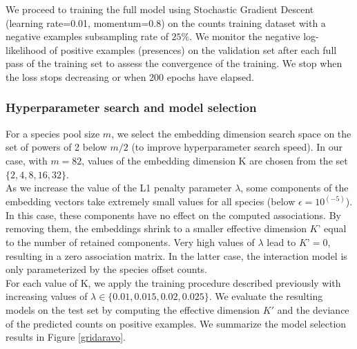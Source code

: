 \documentclass[]{article}
\begin{document}
\noindent We proceed to training the full model using Stochastic Gradient Descent (learning rate=0.01, momentum=0.8) on the counts training dataset with a negative examples subsampling rate of $25\%$. We monitor the negative log-likelihood of positive examples (presences) on the validation set after each full pass of the training set to assess the convergence of the training. We stop when the loss stops decreasing or when 200 epochs have elapsed.

\subsubsection{Hyperparameter search and model selection}
For a species pool size $m$, we select the embedding dimension search space on the set of powers of 2 below $m/2$ (to improve hyperparameter search speed). In our case, with $m=82$, values of the embedding dimension K are chosen from the set $\{2,4,8,16,32\}$. \\

\noindent As we increase the value of the L1 penalty parameter $\lambda$, some components of the embedding vectors take extremely small values for all species (below $\epsilon=10^(-5)$). In this case, these components have no effect on the computed associations. By removing them, the embeddings shrink to a smaller effective dimension $K’$ equal to the number of retained components. Very high values of $\lambda$ lead to $K’=0$, resulting in a zero association matrix. In the latter case, the interaction model is only parameterized by the species offset counts. \\  

\noindent For each value of K, we apply the training procedure described previously with increasing values of $\lambda \in \{0.01,0.015,0.02,0.025\}$. We evaluate the resulting models on the test set by computing the effective dimension $K'$ and the deviance of the predicted counts on positive examples. We summarize the model selection results in Figure \ref{gridaravo}.
\end{document}
